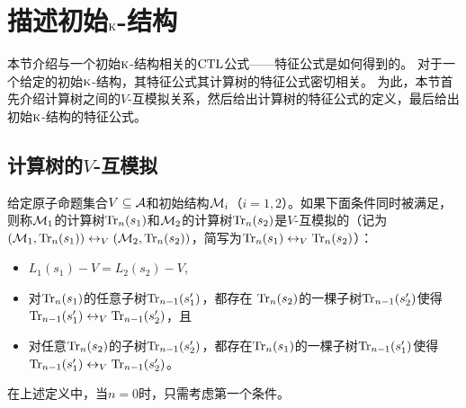 \section{描述初始$\textsc{k}$-结构}\label{sec:chapter06_chaIntC}
本节介绍与一个初始$\textsc{k}$-结构相关的$\textrm{CTL}$公式——特征公式是如何得到的。
对于一个给定的初始$\textsc{k}$-结构，其特征公式其计算树的特征公式密切相关。
为此，本节首先介绍计算树之间的$V$-互模拟关系，然后给出计算树的特征公式的定义，最后给出初始$\textsc{k}$-结构的特征公式。

\subsection{计算树的$V$-互模拟}
给定原子命题集合$V\subseteq {\cal A}$和初始结构${\cal M}_i$（$i = 1, 2$）。如果下面条件同时被满足，则称${\cal M}_1$的计算树$\textrm{Tr}_n(s_1)$和${\cal M}_2$的计算树$\textrm{Tr}_n(s_2)$是$V$-互模拟的（记为$({\cal M}_1,\textrm{Tr}_n(s_1))\leftrightarrow_V({\cal M}_2,\textrm{Tr}_n(s_2))$，简写为$\textrm{Tr}_n(s_1)\leftrightarrow_V\textrm{Tr}_n(s_2)$）：
\begin{itemize}
	\item $L_1(s_1)- V=L_2(s_2)- V$,
	\item 对$\textrm{Tr}_n(s_1)$的任意子树$\textrm{Tr}_{n-1}(s_1')$，都存在  $\textrm{Tr}_n(s_2)$的一棵子树$\textrm{Tr}_{n-1}(s_2')$使得 
	$\textrm{Tr}_{n-1}(s_1')\leftrightarrow_V\textrm{Tr}_{n-1}(s_2')$，且
	\item 对任意$\textrm{Tr}_n(s_2)$的子树$\textrm{Tr}_{n-1}(s_2')$，都存在$\textrm{Tr}_n(s_1)$的一棵子树$\textrm{Tr}_{n-1}(s_1')$使得
	$\textrm{Tr}_{n-1}(s_1')\leftrightarrow_V\textrm{Tr}_{n-1}(s_2')$。
\end{itemize}

在上述定义中，当$n=0$时，只需考虑第一个条件。


